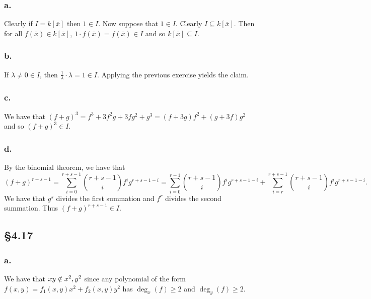 \documentclass[letterpaper]{article}
\begin{document}
\subsubsection*{a.}

Clearly if $I = k[\overline{x}]$ then $1 \in I$.
Now suppose that $1 \in I$.
Clearly $I \subseteq k[\overline{x}]$.
Then for all $f(\overline{x}) \in k[\overline{x}]$, $1 \cdot f(\overline{x}) = f(\overline{x}) \in I$ and so $k[\overline{x}] \subseteq I$.

\subsubsection*{b.}

If $\lambda \neq 0 \in I$, then $\frac{1}{\lambda} \cdot \lambda = 1 \in I$.
Applying the previous exercise yields the claim.

\subsubsection*{c.}

We have that $(f + g)^{3} = f^{3} + 3f^{2}g + 3fg^{2} + g^{3} = (f + 3g)f^{2} + (g + 3f)g^{2}$ and so $(f + g)^{3} \in I$.

\subsubsection*{d.}

By the binomial theorem, we have that
\[
  (f + g)^{r + s - 1} = \sum_{i = 0}^{r + s - 1} \binom{r + s - 1}{i} f^{i} g^{r + s - 1 - i} = \sum_{i = 0}^{r - 1} \binom{r + s - 1}{i} f^{i} g^{r + s - 1 - i} + \sum_{i = r}^{r + s - 1} \binom{r + s - 1}{i} f^{i} g^{r + s - 1 - i}.
\]
We have that $g^{s}$ divides the first summation and $f^{r}$ divides the second summation.
Thus $(f + g)^{r + s - 1} \in I$.

\subsection*{\S 4.17}

\subsubsection*{a.}

We have that $xy \notin \ideal{x^{2}, y^{2}}$ since any polynomial of the form $f(x, y) = f_{1}(x, y)x^{2} + f_{2}(x, y)y^{2}$ has $\deg_{x}(f) \geq 2$ and $\deg_{y}(f) \geq 2$.
\end{document}
